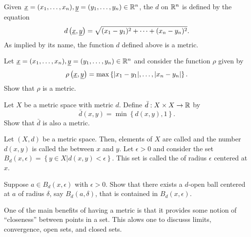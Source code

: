 \begin{example}
Given $\underline{x} = (x_1, \ldots, x_n), \underline{y} = (y_1, \ldots, y_n) \in \mathbb{R}^n$, the  $d$ on $\mathbb{R}^n$ is defined by the equation
\begin{equation*}
d \left( \underline{x}, \underline{y} \right)
= \sqrt{ (x_1 - y_1)^2 + \cdots + (x_n - y_n)^2 }.
\end{equation*}
As implied by its name, the function $d$ defined above is a metric.
\end{example}

\begin{problem}
Let $\underline{x} = (x_1, \ldots, x_n), \underline{y} = (y_1, \ldots, y_n) \in \mathbb{R}^n$ and consider the function $\rho$ given by
\begin{equation*}
\rho \left( \underline{x}, \underline{y} \right)
= \max \left\{ |x_1 - y_1|, \ldots, |x_n - y_n| \right\}.
\end{equation*}
Show that $\rho$ is a metric.
\end{problem}

\begin{problem} \label{problem:StandardBoundedMetric}
Let $X$ be a metric space with metric $d$.
Define $\bar{d} : X \times X \rightarrow \mathbb{R}$ by
\begin{equation*}
\bar{d} (x, y)
= \min \left\{ d (x, y), 1 \right\}.
\end{equation*}
Show that $\bar{d}$ is also a metric.
\end{problem}

Let $(X,d)$ be a metric space.
Then, elements of $X$ are called  and the number $d(x,y)$ is called the  between $x$ and $y$.
Let $\epsilon > 0$ and consider the set $B_d(x,\epsilon) = \left\{ y \in X | d(x,y) < \epsilon \right\}$.
This set is called the  of radius $\epsilon$ centered at $x$.

\begin{problem}
Suppose $a \in B_d(x, \epsilon)$ with $\epsilon > 0$.
Show that there exists a $d$-open ball centered at $a$ of radius $\delta$, say $B_d(a, \delta)$, that is contained in $B_d(x, \epsilon)$.
\end{problem}

One of the main benefits of having a metric is that it provides some notion of ``closeness'' between points in a set.
This alows one to discusss limits, convergence, open sets, and closed sets.

